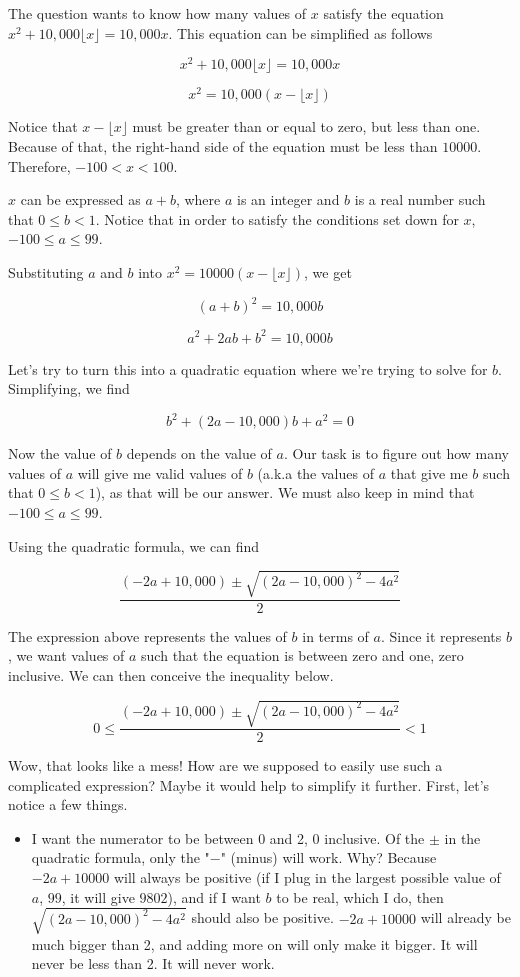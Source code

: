 \begin{enumerate}
The question wants to know how many values of $x$ satisfy the equation $x^2 + 10,000\lfloor x \rfloor = 10,000x$. This equation can be simplified as follows

 
 \[x^2 + 10,000\lfloor x \rfloor = 10,000x\]

 \[x^2 = 10,000(x-\lfloor x \rfloor)\]

 Notice that $x-\lfloor x \rfloor$ must be greater than or equal to zero, but less than one. Because of that, the right-hand side of the equation must be less than $10000$. Therefore, $-100<x<100$.

 $x$ can be expressed as $a+b$, where $a$ is an integer and $b$ is a real number such that $0 \leq b < 1$. Notice that in order to satisfy the conditions set down for $x$, $-100 \leq a \leq 99$.

 Substituting $a$ and $b$ into $x^2 = 10000(x-\lfloor x \rfloor)$, we get

 
 \[(a+b)^2 = 10,000b\]

 \[a^2+2ab+b^2 = 10,000b\]

 Let's try to turn this into a quadratic equation where we're trying to solve for $b$. Simplifying, we find

 
 \[b^2+(2a-10,000)b+a^2 = 0\]

 Now the value of $b$ depends on the value of $a$. Our task is to figure out how many values of $a$ will give me valid values of $b$ (a.k.a the values of $a$ that give me $b$ such that $0 \leq b < 1$), as that will be our answer. We must also keep in mind that $-100 \leq a \leq 99$.

 Using the quadratic formula, we can find

 
 \[\frac{(-2a+10,000) \pm \sqrt{(2a-10,000)^2-4a^2}}{2}\]

 The expression above represents the values of $b$ in terms of $a$. Since it represents $b$, we want values of $a$ such that the equation is between zero and one, zero inclusive. We can then conceive the inequality below.

 
 \[0 \leq \frac{(-2a+10,000) \pm \sqrt{(2a-10,000)^2-4a^2}}{2} < 1\]

 Wow, that looks like a mess! How are we supposed to easily use such a complicated expression? Maybe it would help to simplify it further. First, let's notice a few things.

 
            \begin{itemize}
        \item I want the numerator to be between 0 and 2, 0 inclusive. Of the $\pm$ in the quadratic formula, only the "$-$" (minus) will work. Why? Because $-2a+10000$ will always be positive (if I plug in the largest possible value of $a$, $99$, it will give $9802$), and if I want $b$ to be real, which I do, then $\sqrt{(2a-10,000)^2-4a^2}$ should also be positive. $-2a+10000$ will already be much bigger than 2, and adding more on will only make it bigger. It will never be less than 2. It will never work.
            \end{itemize}
            

\end{enumerate}
